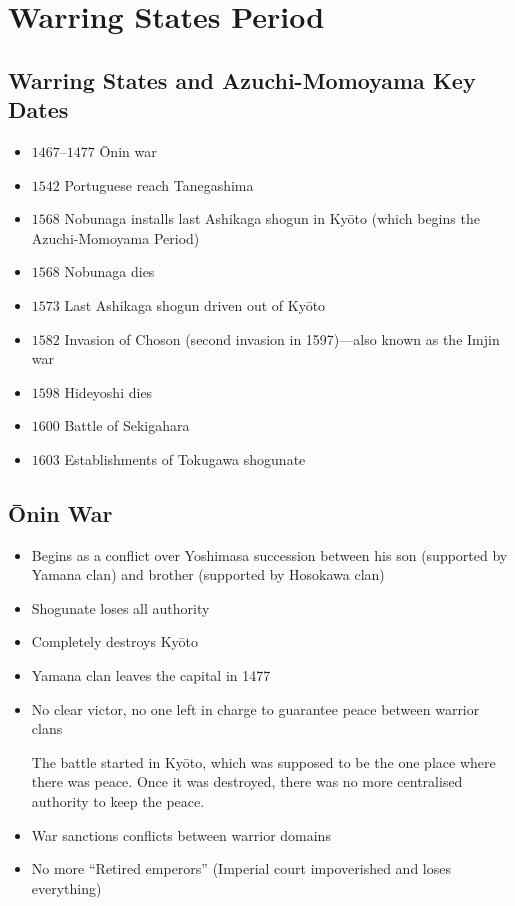 \documentclass[class=article, crop=false]{standalone}
\begin{document}
  \section{Warring States Period}
  \subsection{Warring States and Azuchi-Momoyama Key Dates}
  \begin{itemize}
    \item $1467$--$1477$ \=Onin war
    \item $1542$ Portuguese reach Tanegashima
    \item $1568$ Nobunaga installs last Ashikaga shogun in Ky\=oto (which begins the Azuchi-Momoyama Period)
    \item $1568$ Nobunaga dies
    \item $1573$ Last Ashikaga shogun driven out of Ky\=oto
    \item $1582$ Invasion of Choson (second invasion in 1597)---also known as the Imjin war
    \item $1598$ Hideyoshi dies
    \item $1600$ Battle of Sekigahara
    \item $1603$ Establishments of Tokugawa shogunate
  \end{itemize}
  \subsection{\=Onin War}
  \begin{itemize}
    \item Begins as a conflict over Yoshimasa succession between his son (supported by Yamana clan) and brother (supported by Hosokawa clan)
    \item Shogunate loses all authority
    \item Completely destroys Ky\=oto
    \item Yamana clan leaves the capital in 1477
    \item No clear victor, no one left in charge to guarantee peace between warrior clans
    \begin{note}{}
      The battle started in Ky\=oto, which was supposed to be the one place where there was peace. Once it was destroyed, there was no more centralised authority to keep the peace.
    \end{note}
    \item War sanctions conflicts between warrior domains
    \item No more ``Retired emperors'' (Imperial court impoverished and loses everything)
  \end{itemize}
\end{document}
